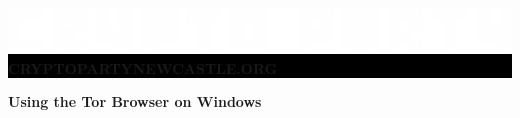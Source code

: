 \documentclass[10.5pt,a4paper]{article} %
\begin{document}

\begin{center}
	\vspace{1cm}
	\colorbox{Black}{
		\begin{minipage}{18.5cm}
			\begin{center}
			\color{white}
			\vspace{0.3cm}
	             \includegraphics[width=1\textwidth]{organisationlogo.eps} %
	        \\[10pt]
			     \textbf{{\LARGE CRYPTOPARTYNEWCASTLE.ORG}} %
			\vspace{0.3cm}
			\end{center}
		\end{minipage}
	}
\end{center}


\begin{center}
\vspace{0.5cm}
\textbf{{\LARGE Using the Tor Browser on Windows} %
\vspace{0.5cm}
}\end{center}
\end{document}
